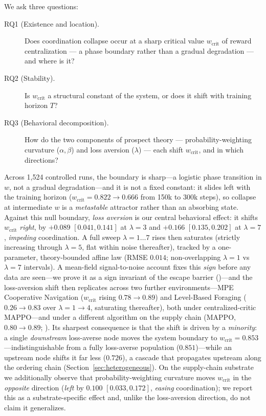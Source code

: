 \documentclass[letterpaper]{article}
\theoremstyle{plain}
\newcommand{\wcrit}{w_{\mathrm{crit}}}
\begin{document}
We ask three questions:
\begin{description}
  \item[RQ1 (Existence and location).] Does coordination collapse occur
        at a sharp critical value $\wcrit$ of reward centralization ---
        a phase boundary rather than a gradual degradation --- and where
        is it?
  \item[RQ2 (Stability).] Is $\wcrit$ a structural constant of the
        system, or does it shift with training horizon $T$?
  \item[RQ3 (Behavioral decomposition).] How do the two components of
        prospect theory --- probability-weighting curvature
        ($\alpha,\beta$) and loss aversion ($\lambda$) --- each shift
        $\wcrit$, and in which directions?
\end{description}

Across 1{,}524 controlled runs, the boundary is sharp---a logistic phase
transition in $w$, not a gradual degradation---and it is not a fixed
constant: it slides left with the training horizon
($\wcrit = 0.822\!\to\!0.666$ from 150k to 300k steps), so collapse at
intermediate $w$ is a \emph{metastable} attractor rather than an absorbing
state. Against this null boundary, \emph{loss aversion} is our central
behavioral effect: it shifts $\wcrit$ \emph{right}, by
$+0.089$ $[0.041, 0.141]$ at $\lambda{=}3$ and $+0.166$ $[0.135, 0.202]$ at
$\lambda{=}7$, \emph{impeding} coordination. A full sweep $\lambda{=}1{\ldots}7$
rises then saturates (strictly increasing through $\lambda{=}5$, flat within
noise thereafter), tracked by a one-parameter, theory-bounded
affine law (RMSE $0.014$; non-overlapping $\lambda{=}1$ vs $\lambda{=}7$
intervals). A mean-field signal-to-noise account fixes this \emph{sign}
before any data are seen---we prove it as a sign invariant of the
escape barrier ()---and the loss-aversion shift then
replicates across two further environments---MPE Cooperative Navigation
($\wcrit$ rising $0.78\!\to\!0.89$) and Level-Based Foraging
($0.26\!\to\!0.83$ over $\lambda{=}1\!\to\!4$, saturating thereafter), both
under centralized-critic MAPPO---and under a different algorithm on the
supply chain (MAPPO, $0.80\!\to\!0.89$; ). Its
sharpest consequence is that the shift is
driven by a \emph{minority}: a single \emph{downstream} loss-averse node
moves the system boundary to $\wcrit = 0.853$---indistinguishable from a
fully loss-averse population ($0.851$)---while an upstream node shifts it far
less ($0.726$), a cascade that propagates upstream along the ordering chain
(Section~\ref{sec:heterogeneous}). On the supply-chain substrate we
additionally observe that probability-weighting curvature moves $\wcrit$ in the
\emph{opposite} direction (\emph{left} by $0.100$ $[0.033, 0.172]$,
\emph{easing} coordination); we report this as a substrate-specific effect and,
unlike the loss-aversion direction, do not claim it generalizes.
\end{document}
